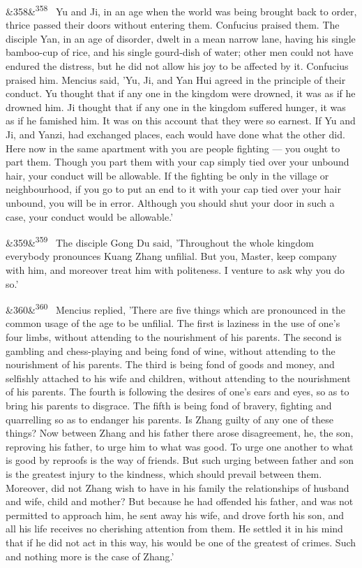 \documentclass[12pt]{article}
\newcommand{\para}[1][]{\par\noindent\ifx&#1&\else\textsuperscript{\footnotesize #1}~\fi}
\begin{document}
\para[358] Yu and Ji, in an age when the world was being brought back to order, thrice passed their doors without entering them. Confucius praised them. The disciple Yan, in an age of disorder, dwelt in a mean narrow lane, having his single bamboo-cup of rice, and his single gourd-dish of water; other men could not have endured the distress, but he did not allow his joy to be affected by it. Confucius praised him. Mencius said, 'Yu, Ji, and Yan Hui agreed in the principle of their conduct. Yu thought that if any one in the kingdom were drowned, it was as if he drowned him. Ji thought that if any one in the kingdom suffered hunger, it was as if he famished him. It was on this account that they were so earnest. If Yu and Ji, and Yanzi, had exchanged places, each would have done what the other did. Here now in the same apartment with you are people fighting --- you ought to part them. Though you part them with your cap simply tied over your unbound hair, your conduct will be allowable. If the fighting be only in the village or neighbourhood, if you go to put an end to it with your cap tied over your hair unbound, you will be in error. Although you should shut your door in such a case, your conduct would be allowable.'

\para[359] The disciple Gong Du said, 'Throughout the whole kingdom everybody pronounces Kuang Zhang unfilial. But you, Master, keep company with him, and moreover treat him with politeness. I venture to ask why you do so.'

\para[360] Mencius replied, 'There are five things which are pronounced in the common usage of the age to be unfilial. The first is laziness in the use of one's four limbs, without attending to the nourishment of his parents. The second is gambling and chess-playing and being fond of wine, without attending to the nourishment of his parents. The third is being fond of goods and money, and selfishly attached to his wife and children, without attending to the nourishment of his parents. The fourth is following the desires of one's ears and eyes, so as to bring his parents to disgrace. The fifth is being fond of bravery, fighting and quarrelling so as to endanger his parents. Is Zhang guilty of any one of these things? Now between Zhang and his father there arose disagreement, he, the son, reproving his father, to urge him to what was good. To urge one another to what is good by reproofs is the way of friends. But such urging between father and son is the greatest injury to the kindness, which should prevail between them. Moreover, did not Zhang wish to have in his family the relationships of husband and wife, child and mother? But because he had offended his father, and was not permitted to approach him, he sent away his wife, and drove forth his son, and all his life receives no cherishing attention from them. He settled it in his mind that if he did not act in this way, his would be one of the greatest of crimes. Such and nothing more is the case of Zhang.'
\end{document}
